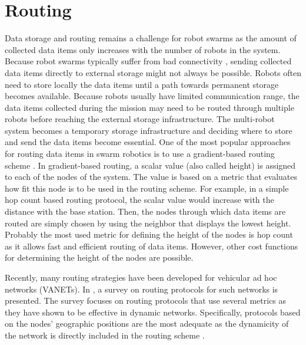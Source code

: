 \section{Routing}
Data storage and routing remains a challenge for robot swarms as the amount of collected data items only increases with the number of robots in the system. Because robot swarms typically suffer from bad connectivity \cite{amigoni2017multirobot}, sending collected data items directly to external storage might not always be possible. Robots often need to store locally the data items until a path towards permanent storage becomes available. Because robots usually have limited communication range, the data items collected during the mission may need to be routed through multiple robots before reaching the external storage infrastructure. The multi-robot system becomes a temporary storage infrastructure and deciding where to store and send the data items become essential.
One of the most popular approaches for routing data items in swarm robotics is to use a gradient-based routing scheme \cite{faruque2005analysis,draves2004comparison,watteyne2009implementation}. In gradient-based routing, a scalar value (also called height) is assigned to each of the nodes of the system. The value is based on a metric that evaluates how fit this node is to be used in the routing scheme. For example, in a simple hop count based routing protocol, the scalar value would increase with the distance with the base station. Then, the nodes through which data items are routed are simply chosen by using the neighbor that displays the lowest height. Probably the most used metric for defining the height of the nodes is hop count \cite{kuruvila2005hop,zhang2014efficient,al2019efficient} as it allows fast and efficient routing of data items. However, other cost functions for determining the height of the nodes are possible.

Recently, many routing strategies have been developed for vehicular ad hoc networks (VANETs). In \cite{tripp2019survey}, a survey on routing protocols for such networks is presented. The survey focuses on routing protocols that use several metrics as they have shown to be effective in dynamic networks. Specifically, protocols based on the nodes' geographic positions are the most adequate as the dynamicity of the network is directly included in the routing scheme \cite{boussoufa2018geographic, fussler2002comparison}.

